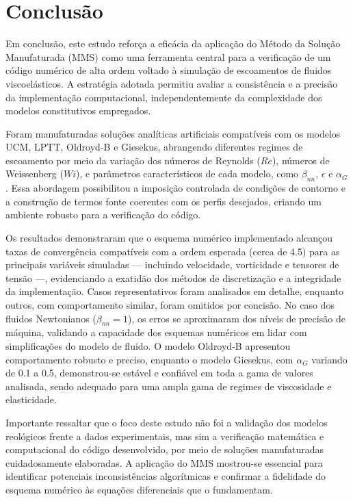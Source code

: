 \chapter[Conclusão]{Conclusão}
\label{Cap_Conclusao}

Em conclusão, este estudo reforça a eficácia da aplicação do Método da Solução Manufaturada (MMS) como uma ferramenta central para a verificação de um código numérico de alta ordem voltado à simulação de escoamentos de fluidos viscoelásticos. A estratégia adotada permitiu avaliar a consistência e a precisão da implementação computacional, independentemente da complexidade dos modelos constitutivos empregados.

Foram manufaturadas soluções analíticas artificiais compatíveis com os modelos UCM, LPTT, Oldroyd-B e Giesekus, abrangendo diferentes regimes de escoamento por meio da variação dos números de Reynolds ($Re$), números de Weissenberg ($Wi$), e parâmetros característicos de cada modelo, como $\beta_{nn}$, $\epsilon$ e $\alpha_G$. Essa abordagem possibilitou a imposição controlada de condições de contorno e a construção de termos fonte coerentes com os perfis desejados, criando um ambiente robusto para a verificação do código.

Os resultados demonstraram que o esquema numérico implementado alcançou taxas de convergência compatíveis com a ordem esperada (cerca de 4.5) para as principais variáveis simuladas — incluindo velocidade, vorticidade e tensores de tensão —, evidenciando a exatidão dos métodos de discretização e a integridade da implementação. Casos representativos foram analisados em detalhe, enquanto outros, com comportamento similar, foram omitidos por concisão. No caso dos fluidos Newtonianos ($\beta_{nn}=1$), os erros se aproximaram dos níveis de precisão de máquina, validando a capacidade dos esquemas numéricos em lidar com simplificações do modelo de fluido. O modelo Oldroyd-B apresentou comportamento robusto e preciso, enquanto o modelo Giesekus, com $\alpha_G$ variando de 0.1 a 0.5, demonstrou-se estável e confiável em toda a gama de valores analisada, sendo adequado para uma ampla gama de regimes de viscosidade e elasticidade.

Importante ressaltar que o foco deste estudo não foi a validação dos modelos reológicos frente a dados experimentais, mas sim a verificação matemática e computacional do código desenvolvido, por meio de soluções manufaturadas cuidadosamente elaboradas. A aplicação do MMS mostrou-se essencial para identificar potenciais inconsistências algorítmicas e confirmar a fidelidade do esquema numérico às equações diferenciais que o fundamentam.

